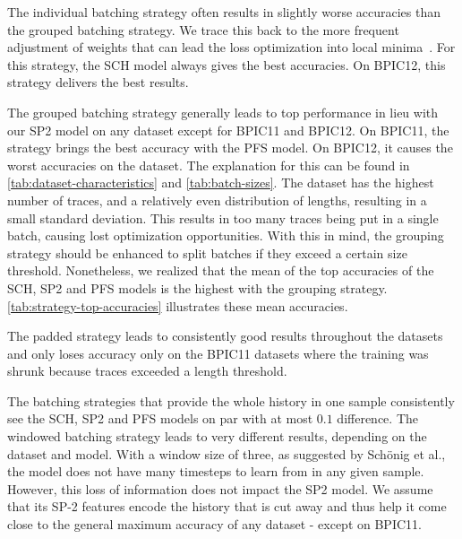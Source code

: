 The individual batching strategy often results in slightly worse accuracies than the grouped batching strategy. We trace this back to the more frequent adjustment of weights that can lead the loss optimization into local minima~\cite{keskar2016large}. For this strategy, the SCH model always gives the best accuracies. On BPIC12, this strategy delivers the best results.

The grouped batching strategy generally leads to top performance in lieu with our SP2 model on any dataset except for BPIC11 and BPIC12. On BPIC11, the strategy brings the best accuracy with the PFS model. On BPIC12, it causes the worst accuracies on the dataset. The explanation for this can be found in \autoref{tab:dataset-characteristics} and \autoref{tab:batch-sizes}. The dataset has the highest number of traces, and a relatively even distribution of lengths, resulting in a small standard deviation. This results in too many traces being put in a single batch, causing lost optimization opportunities. With this in mind, the grouping strategy should be enhanced to split batches if they exceed a certain size threshold. Nonetheless, we realized that the mean of the top accuracies of the SCH, SP2 and PFS models is the highest with the grouping strategy. \autoref{tab:strategy-top-accuracies} illustrates these mean accuracies.

The padded strategy leads to consistently good results throughout the datasets and only loses accuracy only on the BPIC11 datasets where the training was shrunk because traces exceeded a length threshold.

The batching strategies that provide the whole history in one sample consistently see the SCH, SP2 and PFS models on par with at most $0.1$ difference. The windowed batching strategy leads to very different results, depending on the dataset and model. With a window size of three, as suggested by Schönig et al., the model does not have many timesteps to learn from in any given sample. However, this loss of information does not impact the SP2 model. We assume that its SP-2 features encode the history that is cut away and thus help it come close to the general maximum accuracy of any dataset - except on BPIC11.


